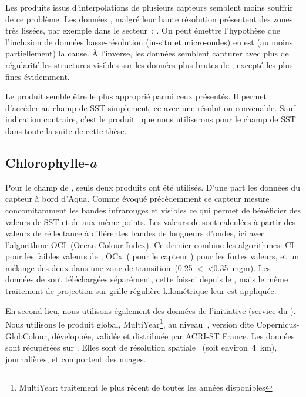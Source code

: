Les produits issus d'interpolations de plusieurs capteurs semblent moins souffrir de ce problème.
Les données , malgré leur haute résolution présentent des zones très lissées, par exemple dans le secteur~; .
On peut émettre l'hypothèse que l'inclusion de données basse-résolution (in-situ et micro-ondes) en est (au moins partiellement) la cause.
À l'inverse, les données  semblent capturer avec plus de régularité les structures visibles sur les données plus brutes de , excepté les plus fines évidemment.

Le produit  semble être le plus approprié parmi ceux présentés.
Il permet d'accéder au champ de SST simplement, ce avec une résolution convenable.
Sauf indication contraire, c'est le produit~ que nous utiliserons pour le champ de SST dans toute la suite de cette thèse.

\subsection{Chlorophylle-\textit{a}}
\label{sec:donnees-chl}

Pour le champ de , seuls deux produits ont été utilisés.
D'une part les données du capteur  à bord d'Aqua.
Comme évoqué précédemment ce capteur mesure concomitamment les bandes infrarouges et visibles ce qui permet de bénéficier des valeurs de SST et de  aux même points.
Les valeurs de  sont calculées à partir des valeurs de réflectance à différentes bandes de longueurs d'ondes, ici avec l'algorithme OCI~(Ocean Colour Index).
Ce dernier combine les algorithmes: CI pour les faibles valeurs de , OCx~(  pour le capteur ) pour les fortes valeurs, et un mélange des deux dans une zone de transition~(0.25~\textless {}~\textless 0.35~\unit{mgm}).
Les données de  sont téléchargées séparément, cette fois-ci depuis le , mais le même traitement de projection sur grille régulière kilométrique leur est appliquée.

En second lieu, nous utilisons également des données de l'initiative  (service du ).
Nous utilisons le produit global, MultiYear\footnote{%
  MultiYear: traitement le plus récent de toutes les années disponibles
}, au niveau~, version dite Copernicus-GlobColour, développée, validée et distribuée par ACRI-ST France.
Les données sont récupérées sur .
Elles sont de résolution spatiale~ (soit environ~\qty{4}{\km}), journalières, et comportent des nuages.

